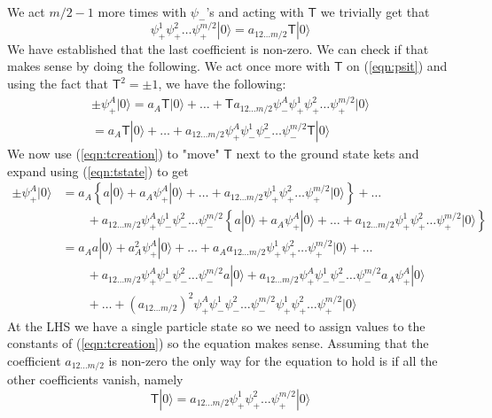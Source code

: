 \documentclass[12pt,a4paper]{article}
\begin{document}
We act $ m/2 -1 $ more times with $ \psi _- $'s and acting with $ \mathsf{T} $ we trivially get that
\begin{equation}
	\psi _+ ^1 \psi ^2_+ \dots \psi _+ ^{ m/2 } | 0 \rangle = a _{ 12 \dots m/2 } \mathsf{T} | 0 \rangle
\end{equation}
We have established that the last coefficient is non-zero. We can check if that makes sense by doing the following. We act once more with $ \mathsf{T} $ on (\ref{eqn:psit}) and using the fact that $ \mathsf{T}^2 = \pm 1  $, we have the following:
\begin{align*}
	\pm \psi_+^A | 0 \rangle = a_A \mathsf{T} | 0 \rangle + \dots +\mathsf{T} a _{ 12\dots m/2 } \psi_- ^A \psi_+ ^1 \psi_+^2 \dots \psi_+ ^{ m/2 } | 0 \rangle \\
	= a_A \mathsf{T} | 0 \rangle + \dots + a _{12\dots m/2} \psi_+^A \psi_-^1 \psi_-^2 \dots \psi_-^{m/2} \mathsf{T}| 0 \rangle
\end{align*}
We now use (\ref{eqn:tcreation}) to "move" $ \mathsf{T} $ next to the ground state kets and expand using (\ref{eqn:tstate}) to get
\begin{align*}
	\pm \psi _+^A | 0 \rangle &= 
	a_A \left\{ a | 0 \rangle + a_A \psi _+ ^A | 0 \rangle + \dots + a _{ 12\dots m/2 }\psi_+ ^1 \psi_+^2 \dots \psi_+ ^{ m/2 } | 0 \rangle   \right\} + \dots \\
	&\qquad + a _{ 12\dots m/2 } \psi_+^A \psi_- ^1 \psi_-^2 \dots \psi_- ^{ m/2 } \left\{ a | 0 \rangle + a_A \psi _+ ^A | 0 \rangle + \dots + a _{ 12\dots m/2 }\psi_+ ^1 \psi_+^2 \dots \psi_+ ^{ m/2 } | 0 \rangle   \right\}  \\
	&= a_A a | 0 \rangle +a_A^2 \psi_+^A | 0 \rangle + \dots + a_A a _{ 12\dots m/2 } \psi _+^1 \psi _+^2 \dots \psi _+ ^{ m/2 } | 0 \rangle +\dots \\
	&\qquad+ a _{ 12\dots m/2 } \psi _+ ^A \psi _- ^1 \psi _- ^2 \dots \psi _- ^{ m/2 } a | 0 \rangle + a _{ 12\dots m/2 } \psi _+^A \psi _-^1 \psi _-^2 \dots \psi _- ^{ m/2 } a_A \psi _+ ^A | 0 \rangle \\
	&\qquad+ \dots + \left( a _{ 12 \dots m/2 }  \right) ^2 \psi _+^A \psi _-^1 \psi _-^2 \dots \psi _- ^{ m/2 } \psi _+ ^1 \psi _+ ^2 \dots \psi _+ ^{ m/2 } | 0 \rangle 
\end{align*}
At the LHS we have a single particle state so we need to assign values to the constants of (\ref{eqn:tcreation}) so the equation makes sense. Assuming that the coefficient $ a _{ 12 \dots m/2 }  $ is non-zero the only way for the equation to hold is if all the other coefficients vanish, namely
\begin{equation}
	\mathsf{T} | 0 \rangle = a _{ 12\dots m/2 } \psi _+ ^{ 1 } \psi _+ ^{ 2 } \dots \psi _+ ^{ m/2 } | 0 \rangle
	\label{eqn:final}
\end{equation}
\end{document}
